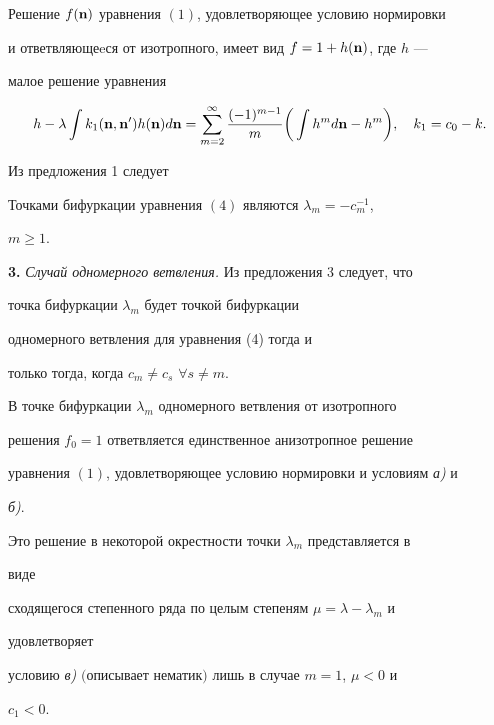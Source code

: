 \begin{prop}


Решение $f(\bold n)$ уравнения $(1)$, удовлетворяющее условию нормировки


и ответвляющеeся от изотропного, имеет вид $f=1+h(\bold n)$, где $h$ ---


малое решение уравнения


\begin{equation}


h-\lambda\int k_1(\bold n,\bold n')h(\bold n)d\bold n=


\sum^\infty_{m=2}\frac{(-1)^{m-1}}{m}\bigg(\int h^m d\bold n-


h^m\bigg),\quad k_1=c_0-k.


\end{equation}


\end{prop}





Из предложения 1 следует





\begin{prop}


Точками бифуркации уравнения $(4)$ являются $\lambda_m=-c^{-1}_m$, 


$m\ge1$.


\end{prop}





{\bf 3.} {\it Случай одномерного ветвления.} Из предложения 3 следует, что


точка бифуркации $\lambda_m$ будет точкой бифуркации 


одномерного ветвления для уравнения (4) тогда и


только тогда, когда $c_m\ne c_s$ $\forall s\ne m$.





\begin{thm}


В точке бифуркации $\lambda_m$ одномерного ветвления от изотропного 


решения $f_0{=}1$ ответвляется единственное анизотропное решение


уравнения $(1)$, удовлетворяющее условию нормировки и условиям {\em а)} и 


{\em б)}. 


Это решение в некоторой окрестности точки $\lambda_m$ представляется в 


виде


сходящегося степенного ряда по целым степеням $\mu=\lambda-\lambda_m$ и 


удовлетворяет


условию {\em в)} $($описывает нематик$)$ лишь в случае $m=1$, $\mu<0$ и 


$c_1<0$.


\end{thm}





